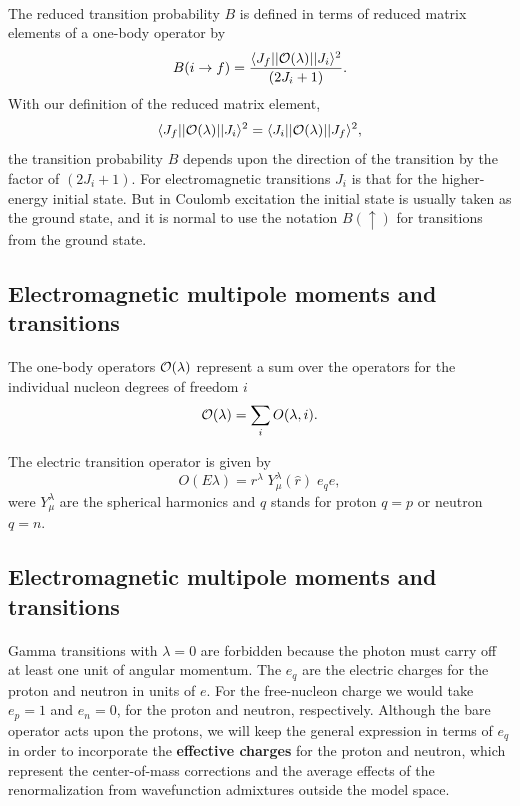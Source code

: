 \documentclass[%
oneside,                 %
final,                   %
10pt]{article}
\begin{document}
\paragraph{}
The reduced
transition probability $B$ is defined in terms of reduced matrix
elements of a one-body operator by
\[
B(i \rightarrow f)= \frac{\langle J_{f}||{\cal O}(\lambda )||J_{i}\rangle^{2}}{(2J_{i}+1)}. 
\]
With our definition of the reduced matrix element,
\[
\langle J_{f}||{\cal O}(\lambda )||J_{i}\rangle^{2} =\langle J_{i}||{\cal O}(\lambda )||J_{f}\rangle^{2},  
\]
the transition probability $B$ depends upon the direction of the transition by the factor
of $(2J_{i}+1)$. For electromagnetic
transitions $J_{i}$ is that for the higher-energy initial state. But in
Coulomb excitation the initial state is usually
taken as the ground state, and it is normal to use the notation $B(\uparrow)$ for transitions from the ground state.



\subsection{Electromagnetic multipole moments and transitions}

\paragraph{}
The one-body operators ${\cal O}(\lambda)$ represent a sum over
the operators for the individual nucleon degrees of freedom  $i$
\[
{\cal O}(\lambda ) = \sum_{i} O(\lambda ,i). 
\]

The electric transition operator is given by
\[
O(E\lambda ) = r^{\lambda } \; Y^{\lambda }_{\mu }(\hat{r}) \; e_{q} e, 
\]
were $Y^{\lambda }_{\mu }$ are the spherical harmonics
and $q$ stands for proton $q=p$ or neutron $q=n$.




\subsection{Electromagnetic multipole moments and transitions}

\paragraph{}
Gamma transitions
with $\lambda=0$ are forbidden because the photon must carry off
at least one unit of angular momentum. The $e_{q}$
are the electric charges for the proton and neutron in units of $e$.
For the free-nucleon
charge we would take $e_{p}=1$ and $e_{n}=0$, for the
proton and neutron, respectively.
Although the bare operator acts upon the protons,
we will keep the general expression in terms of $e_{q}$ in order
to incorporate the \textbf{effective charges} for the proton and
neutron, which represent the center-of-mass corrections and the
average effects of the renormalization from wavefunction
admixtures outside the model space.
\end{document}
